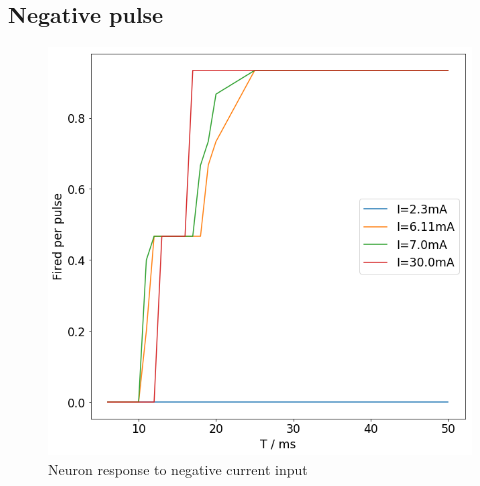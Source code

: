 \documentclass[twoside,twocolumn]{article}
\begin{document}
\twocolumn
\subsection{ Negative pulse}


\begin{figure}[h]
  \centering
    \includegraphics[width=\linewidth]{neg}
  \caption{Neuron response to negative current input}
  \label{fig:2d}
\end{figure}
\end{document}
